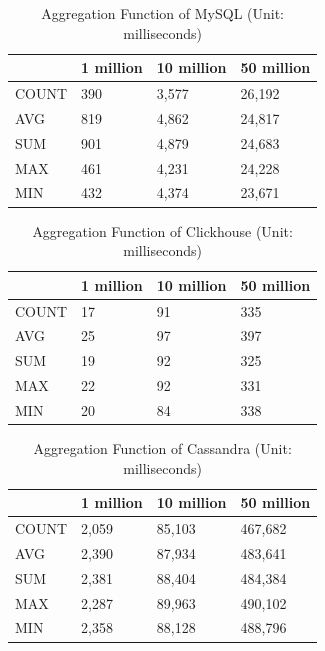 \begin{table}[hbt!]
\centering
\begin{tabular}{@{}llll@{}}
\toprule
      & 1 million & 10 million & 50 million \\ \midrule
COUNT & 390       & 3,577       & 26,192      \\
AVG   & 819       & 4,862       & 24,817      \\
SUM   & 901       & 4,879       & 24,683      \\
MAX   & 461       & 4,231       & 24,228      \\
MIN   & 432       & 4,374       & 23,671      \\ \bottomrule
\end{tabular}
\caption{Aggregation Function of MySQL (Unit: milliseconds)}
\label{tab:agg_mysql}
\end{table}



\begin{table}[hbt!]
\centering
\begin{tabular}{@{}llll@{}}
\toprule
      & 1 million & 10 million & 50 million \\ \midrule
COUNT & 17        & 91         & 335        \\
AVG   & 25        & 97         & 397        \\
SUM   & 19        & 92         & 325        \\
MAX   & 22        & 92         & 331        \\
MIN   & 20        & 84         & 338        \\ \bottomrule
\end{tabular}
\caption{Aggregation Function of Clickhouse (Unit: milliseconds)}
\label{tab:agg_clickhouse}
\end{table}



\begin{table}[hbt!]
\centering
\begin{tabular}{@{}llll@{}}
\toprule
      & 1 million & 10 million & 50 million \\ \midrule
COUNT & 2,059      & 85,103      & 467,682     \\
AVG   & 2,390      & 87,934      & 483,641     \\
SUM   & 2,381      & 88,404      & 484,384     \\
MAX   & 2,287      & 89,963      & 490,102     \\
MIN   & 2,358      & 88,128      & 488,796     \\ \bottomrule
\end{tabular}
\caption{Aggregation Function of Cassandra (Unit: milliseconds)}
\label{tab:agg_cassandra}
\end{table}

